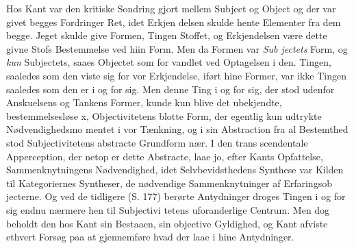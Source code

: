 \documentclass[12pt,a4paper]{book}
\begin{document}
Hos Kant var den kritiske Sondring gjort mellem Subject
og Object og der var givet begges Fordringer Ret, idet Erkjen\-%
delsen skulde hente Elementer fra dem begge. Jeget skulde
give Formen, Tingen Stoffet, og Erkjendelsen være dette givne
Stofs Bestemmelse ved hiin Form. Men da Formen var \emph{Sub\-%
jectets} Form, og \emph{kun} Subjectets, saaes Objectet som for\-%
vandlet ved Optagelsen i den. Tingen, saaledes som den viste
sig for vor Erkjendelse, iført hine Former, var ikke Tingen
saaledes som den er i og for sig. Men denne Ting i og for
sig, der stod udenfor Anskuelsens og Tankens Former, kunde
kun blive det ubekjendte, bestemmelsesløse x, Objectivitetens
blotte Form, der egentlig kun udtrykte Nødvendighedsmo\-%
mentet i vor Tænkning, og i sin Abstraction fra al Bestemthed
stod Subjectivitetens abstracte Grundform nær. I den trans\-%
scendentale Apperception, der netop er dette Abstracte, laae
jo, efter Kants Opfattelse, Sammenknytningens Nødvendighed,
idet Selvbevidsthedens Synthese var Kilden til Kategoriernes
Syntheser, de nødvendige Sammenknytninger af Erfaringsob\-%
jecterne. Og ved de tidligere (S. 177) berørte Antydninger
droges Tingen i og for sig endnu nærmere hen til Subjectivi\-%
tetens uforanderlige Centrum. Men dog beholdt den hos Kant
sin Bestaaen, sin objective Gyldighed, og Kant afviste ethvert
Forsøg paa at gjennemføre hvad der laae i hine Antydninger.
\end{document}
